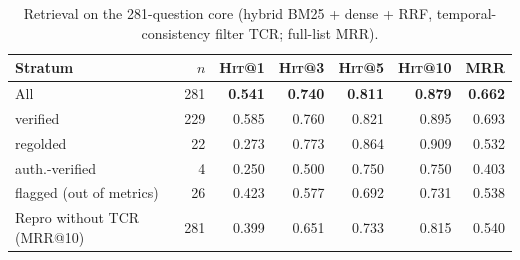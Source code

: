 \documentclass[10pt,a4paper,twocolumn]{article}
\newcommand{\hit}{\textsc{Hit}}
\begin{document}
\begin{table}[t]
\centering\scriptsize
\caption{Retrieval on the 281-question core (hybrid BM25 + dense + RRF, temporal-consistency filter TCR; full-list MRR).}
\label{tab:core-retrieval}
\setlength{\tabcolsep}{2.6pt}
\begin{tabular}{lrrrrrr}
\toprule
Stratum & $n$ & \hit{}@1 & \hit{}@3 & \hit{}@5 & \hit{}@10 & MRR \\
\midrule
All & 281 & \textbf{0.541} & \textbf{0.740} & \textbf{0.811} & \textbf{0.879} & \textbf{0.662} \\
\quad verified & 229 & 0.585 & 0.760 & 0.821 & 0.895 & 0.693 \\
\quad regolded & 22 & 0.273 & 0.773 & 0.864 & 0.909 & 0.532 \\
\quad auth.-verified & 4 & 0.250 & 0.500 & 0.750 & 0.750 & 0.403 \\
\quad flagged (out of metrics) & 26 & 0.423 & 0.577 & 0.692 & 0.731 & 0.538 \\
\midrule
Repro without TCR (MRR@10) & 281 & 0.399 & 0.651 & 0.733 & 0.815 & 0.540 \\
\bottomrule
\end{tabular}
\end{table}
\end{document}
